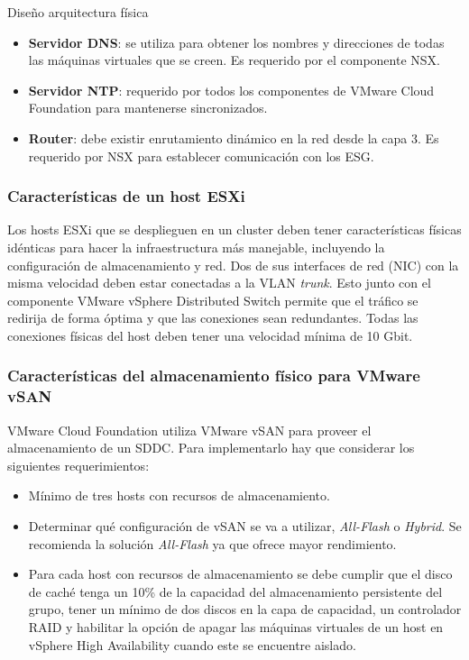 \begin{subsection}{Diseño arquitectura física}
\begin{itemize}
    \item \textbf{Servidor DNS}: se utiliza para obtener los nombres y direcciones de todas las máquinas virtuales que se creen. Es requerido por el componente NSX.
    \item \textbf{Servidor NTP}: requerido por todos los componentes de VMware Cloud Foundation para mantenerse sincronizados.
    
    \item \textbf{Router}: debe existir enrutamiento dinámico en la red desde la capa 3. Es requerido por NSX para establecer comunicación con los ESG. 

\end{itemize}

\subsubsection{Características de un host ESXi}
Los hosts ESXi que se desplieguen en un cluster deben tener características físicas idénticas para hacer la infraestructura más manejable,  incluyendo la configuración de almacenamiento y red.
Dos de sus interfaces de red (NIC) con la misma velocidad deben estar conectadas a la VLAN \textit{trunk}. Esto junto con el componente VMware vSphere Distributed Switch permite que el tráfico se redirija de forma óptima y que las conexiones sean redundantes. Todas las conexiones físicas del host deben tener una velocidad mínima de 10 Gbit.

\subsubsection{Características del almacenamiento físico para VMware vSAN}
VMware Cloud Foundation utiliza VMware vSAN para proveer el almacenamiento de un SDDC. Para implementarlo hay que considerar los siguientes requerimientos:
\begin{itemize}
    \item Mínimo de tres hosts con recursos de almacenamiento.
    \item Determinar qué configuración de vSAN se va a utilizar, \textit{All-Flash} o \textit{Hybrid}. Se recomienda la solución \textit{All-Flash} ya que ofrece mayor rendimiento.
    \item Para cada host con recursos de almacenamiento se debe cumplir que el disco de caché tenga un 10\% de la capacidad del almacenamiento persistente del grupo, tener un mínimo de dos discos en la capa de capacidad, un controlador RAID y habilitar la opción de apagar las máquinas virtuales de un host en vSphere High Availability cuando este se encuentre aislado.
\end{itemize}

\end{subsection}



